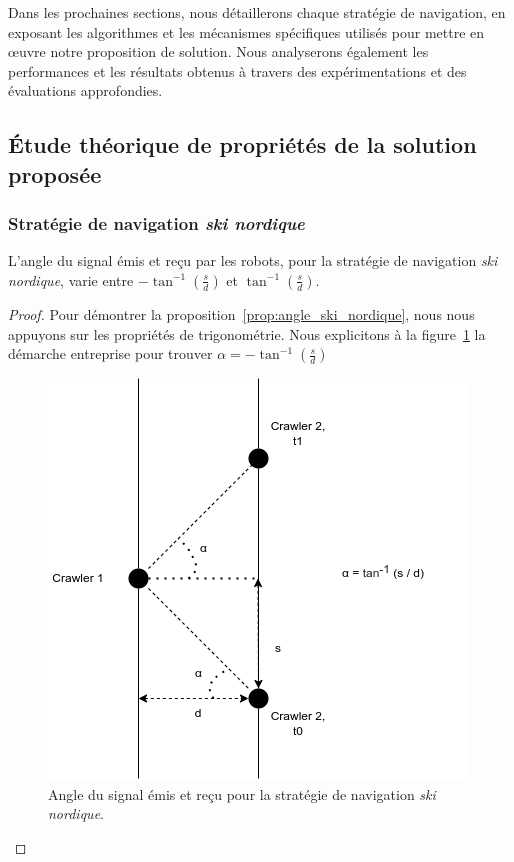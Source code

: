 \documentclass[francais,RandD]{rapportPFE}
\begin{document}
				Dans les prochaines sections, nous détaillerons chaque stratégie de navigation, en exposant les algorithmes et les mécanismes spécifiques utilisés pour mettre en œuvre notre proposition de solution. Nous analyserons également les performances et les résultats obtenus à travers des expérimentations et des évaluations approfondies.
		\subsection{Étude théorique de propriétés de la solution proposée}
			\subsubsection*{Stratégie de navigation \textit{ski nordique}}
				\begin{Proposition}
					L'angle du signal émis et reçu par les robots, pour la stratégie de navigation \textit{ski nordique}, varie entre $-\tan^{-1}(\frac{s}{d})$ et $\tan^{-1}(\frac{s}{d})$.
					\label{prop:angle_ski_nordique}
				\end{Proposition}
				\begin{proof}
					Pour démontrer la proposition~\ref{prop:angle_ski_nordique}, nous nous appuyons sur les propriétés de trigonométrie.
					Nous explicitons à la figure~\ref{fig:angle_ski_nordique} la démarche entreprise pour trouver $\alpha = -\tan^{-1}(\frac{s}{d})$

					\begin{figure}[h!]
						\centering
						\includegraphics[scale=0.5]{graphics/angle_ski_nordique.png}
						\caption{Angle du signal émis et reçu pour la stratégie de navigation \textit{ski nordique}.}
						\label{fig:angle_ski_nordique}
					\end{figure}
				\end{proof}
\end{document}
